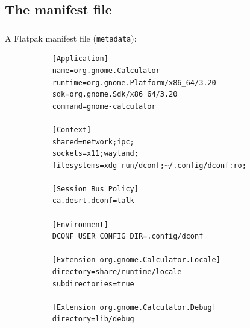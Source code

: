 \subsection{The manifest file}
\begin{frame}[fragile]
  \frametitle{\insertsubsection}

  A Flatpak manifest file (\texttt{metadata}):
    \begin{tiny}
\begin{verbatim}
           [Application]
           name=org.gnome.Calculator
           runtime=org.gnome.Platform/x86_64/3.20
           sdk=org.gnome.Sdk/x86_64/3.20
           command=gnome-calculator

           [Context]
           shared=network;ipc;
           sockets=x11;wayland;
           filesystems=xdg-run/dconf;~/.config/dconf:ro;

           [Session Bus Policy]
           ca.desrt.dconf=talk

           [Environment]
           DCONF_USER_CONFIG_DIR=.config/dconf

           [Extension org.gnome.Calculator.Locale]
           directory=share/runtime/locale
           subdirectories=true

           [Extension org.gnome.Calculator.Debug]
           directory=lib/debug
\end{verbatim}
    \end{tiny}
\end{frame}

